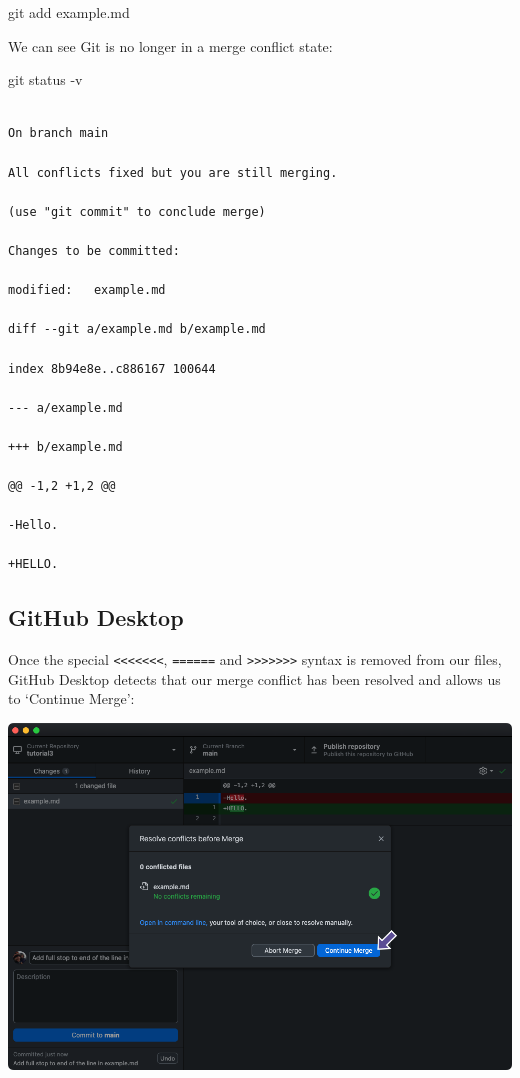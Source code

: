 \documentclass[
  letterpaper,
  DIV=11,
  numbers=noendperiod]{scrartcl}
\newenvironment{Shaded}{\begin{snugshade}}{\end{snugshade}}
\newcommand{\AttributeTok}[1]{\textcolor[rgb]{0.40,0.45,0.13}{#1}}
\newcommand{\FunctionTok}[1]{\textcolor[rgb]{0.28,0.35,0.67}{#1}}
\newcommand{\NormalTok}[1]{\textcolor[rgb]{0.00,0.23,0.31}{#1}}
\begin{document}
\begin{Shaded}
\begin{Highlighting}[]
\FunctionTok{git}\NormalTok{ add example.md}
\end{Highlighting}
\end{Shaded}

We can see Git is no longer in a merge conflict state:

\begin{Shaded}
\begin{Highlighting}[]
\FunctionTok{git}\NormalTok{ status }\AttributeTok{{-}v}
\end{Highlighting}
\end{Shaded}

\begin{verbatim}

On branch main

All conflicts fixed but you are still merging.

(use "git commit" to conclude merge)

Changes to be committed:

modified:   example.md

diff --git a/example.md b/example.md

index 8b94e8e..c886167 100644

--- a/example.md

+++ b/example.md

@@ -1,2 +1,2 @@

-Hello.

+HELLO.
\end{verbatim}

\subsection{GitHub Desktop}

Once the special
\texttt{\textless{}\textless{}\textless{}\textless{}\textless{}\textless{}\textless{}},
\texttt{======} and
\texttt{\textgreater{}\textgreater{}\textgreater{}\textgreater{}\textgreater{}\textgreater{}\textgreater{}}
syntax is removed from our files, GitHub Desktop detects that our merge
conflict has been resolved and allows us to `Continue Merge':

\includegraphics{images/image55.png}
\end{document}
